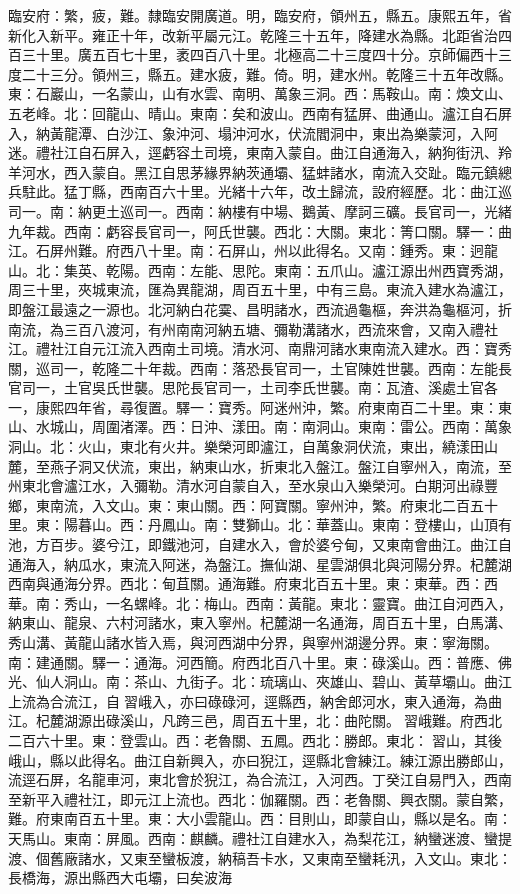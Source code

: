 \begin{pinyinscope}
臨安府：繁，疲，難。隸臨安開廣道。明，臨安府，領州五，縣五。康熙五年，省新化入新平。雍正十年，改新平屬元江。乾隆三十五年，降建水為縣。北距省治四百三十里。廣五百七十里，袤四百八十里。北極高二十三度四十分。京師偏西十三度二十三分。領州三，縣五。建水疲，難。倚。明，建水州。乾隆三十五年改縣。東：石巖山，一名蒙山，山有水雲、南明、萬象三洞。西：馬鞍山。南：煥文山、五老峰。北：回龍山、晴山。東南：矣和波山。西南有猛屏、曲通山。瀘江自石屏入，納黃龍潭、白沙江、象沖河、塌沖河水，伏流閻洞中，東出為樂蒙河，入阿迷。禮社江自石屏入，逕虧容土司境，東南入蒙自。曲江自通海入，納狗街汛、羚羊河水，西入蒙自。黑江自思茅緣界納茨通壩、猛蚌諸水，南流入交趾。臨元鎮總兵駐此。猛丁縣，西南百六十里。光緒十六年，改土歸流，設府經歷。北：曲江巡司一。南：納更土巡司一。西南：納樓有中場、鵝黃、摩訶三礦。長官司一，光緒九年裁。西南：虧容長官司一，阿氏世襲。西北：大關。東北：箐口關。驛一：曲江。石屏州難。府西八十里。南：石屏山，州以此得名。又南：鍾秀。東：迥龍山。北：集英、乾陽。西南：左能、思陀。東南：五爪山。瀘江源出州西寶秀湖，周三十里，夾城東流，匯為異龍湖，周百五十里，中有三島。東流入建水為瀘江，即盤江最遠之一源也。北河納白花霙、昌明諸水，西流過龜樞，奔洪為龜樞河，折南流，為三百八渡河，有州南南河納五塘、彌勒溝諸水，西流來會，又南入禮社江。禮社江自元江流入西南土司境。清水河、南鼎河諸水東南流入建水。西：寶秀關，巡司一，乾隆二十年裁。西南：落恐長官司一，土官陳姓世襲。西南：左能長官司一，土官吳氏世襲。思陀長官司一，土司李氏世襲。南：瓦渣、溪處土官各一，康熙四年省，尋復置。驛一：寶秀。阿迷州沖，繁。府東南百二十里。東：東山、水城山，周圍渚澤。西：日沖、漾田。南：南洞山。東南：雷公。西南：萬象洞山。北：火山，東北有火井。樂榮河即瀘江，自萬象洞伏流，東出，繞漾田山麓，至燕子洞又伏流，東出，納東山水，折東北入盤江。盤江自寧州入，南流，至州東北會瀘江水，入彌勒。清水河自蒙自入，至水泉山入樂榮河。白期河出祿豐鄉，東南流，入文山。東：東山關。西：阿寶關。寧州沖，繁。府東北二百五十里。東：陽暮山。西：丹鳳山。南：雙獅山。北：華蓋山。東南：登樓山，山頂有池，方百步。婆兮江，即鐵池河，自建水入，會於婆兮甸，又東南會曲江。曲江自通海入，納瓜水，東流入阿迷，為盤江。撫仙湖、星雲湖俱北與河陽分界。杞麓湖西南與通海分界。西北：甸苴關。通海難。府東北百五十里。東：東華。西：西華。南：秀山，一名螺峰。北：梅山。西南：黃龍。東北：靈寶。曲江自河西入，納東山、龍泉、六村河諸水，東入寧州。杞麓湖一名通海，周百五十里，白馬溝、秀山溝、黃龍山諸水皆入焉，與河西湖中分界，與寧州湖邊分界。東：寧海關。南：建通關。驛一：通海。河西簡。府西北百八十里。東：碌溪山。西：普應、佛光、仙人洞山。南：茶山、九街子。北：琉璃山、夾雄山、碧山、黃草壩山。曲江上流為合流江，自習峨入，亦曰碌碌河，逕縣西，納舍郎河水，東入通海，為曲江。杞麓湖源出碌溪山，凡跨三邑，周百五十里，北：曲陀關。習峨難。府西北二百六十里。東：登雲山。西：老魯關、五鳳。西北：勝郎。東北：習山，其後峨山，縣以此得名。曲江自新興入，亦曰猊江，逕縣北會練江。練江源出勝郎山，流逕石屏，名龍車河，東北會於猊江，為合流江，入河西。丁癸江自易門入，西南至新平入禮社江，即元江上流也。西北：伽羅關。西：老魯關、興衣關。蒙自繁，難。府東南百五十里。東：大小雲龍山。西：目則山，即蒙自山，縣以是名。南：天馬山。東南：屏風。西南：麒麟。禮社江自建水入，為梨花江，納蠻迷渡、蠻提渡、個舊廠諸水，又東至蠻板渡，納稿吾卡水，又東南至蠻耗汛，入文山。東北：長橋海，源出縣西大屯壩，曰矣波海
\end{pinyinscope}
